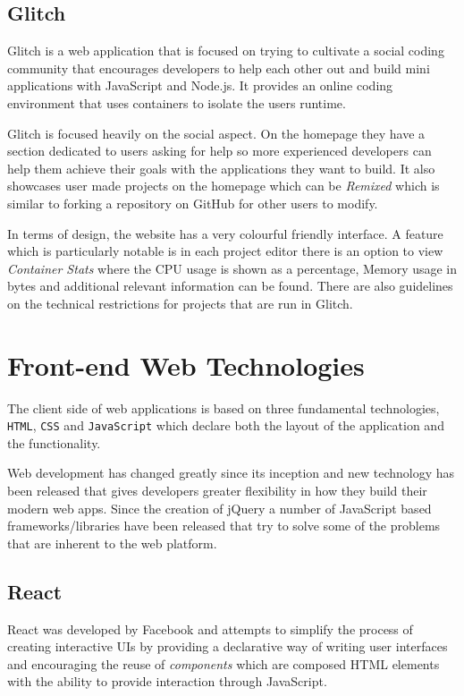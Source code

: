 \subsection{Glitch}
Glitch is a web application that is focused on trying to cultivate a social coding community that encourages developers to help each other out and build mini applications with JavaScript and Node.js. It provides an online coding environment that uses containers to isolate the users runtime.

Glitch is focused heavily on the social aspect. On the homepage they have a section dedicated to users asking for help so more experienced developers can help them achieve their goals with the applications they want to build. It also showcases user made projects on the homepage which can be \textit{Remixed} which is similar to forking a repository on GitHub for other users to modify.

In terms of design, the website has a very colourful friendly interface. A feature which is particularly notable is in each project editor there is an option to view \textit{Container Stats} where the CPU usage is shown as a percentage, Memory usage in bytes and additional relevant information can be found. There are also guidelines on the technical restrictions for projects that are run in Glitch. 

\section{Front-end Web Technologies} \label{lit-front-end}

The client side of web applications is based on three fundamental technologies, \texttt{HTML}, \texttt{CSS} and \texttt{JavaScript} which declare both the layout of the application and the functionality.

Web development has changed greatly since its inception and new technology has been released that gives developers greater flexibility in how they build their modern web apps. Since the creation of jQuery \cite{jquery} a number of JavaScript based frameworks/libraries have been released that try to solve some of the problems that are inherent to the web platform.

\subsection{React}

React was developed by Facebook and attempts to simplify the process of creating interactive UIs by providing a declarative way of writing user interfaces and encouraging the reuse of \textit{components} which are composed HTML elements with the ability to provide interaction through JavaScript.

